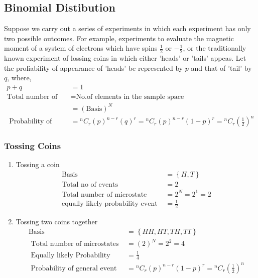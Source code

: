 \subsection{ Binomial Distibution}
Suppose we carry out a series of experiments in which each experiment has only two possible outcomes. For example, experiments to evaluate the magnetic moment of a system of electrons which have spins $\frac{1}{2}$ or $-\frac{1}{2}$, or the traditionally known experiment of lossing coins in which either 'heads' or 'tails' appeas. Let the proliabifity of appearance of 'heads' be represented by $p$ and that of 'tail' by $q$, where,
\begin{align*}
p+q&=1\\
\text{Total number of microstate }&=\text{No.of elements in the sample space}\\&=\left(\text{Basis} \right)^N\\
\text { Probability of general event } 
&={ }^{n} C_{r}(p)^{n-r}(q)^{r} ={ }^{n} C_{r}(p)^{n-r}(1-p)^{r}=
{ }^{n} C_{r}\left(\frac{1}{2}\right)^{n}
\end{align*}
\subsubsection{ Tossing Coins}
\begin{enumerate}
	\item Tossing a coin
	\begin{align*}
	\text{Basis }&=\left\lbrace H,T\right\rbrace \\
	\text{Total no of events }&=2\\
	\text{Total number of microstate }&=2^N=2^1=2 \\
	\text{equally likely probability event }&=\frac{1}{2} 
	\end{align*}
	\item {Tossing two coins together}
	\begin{align*}
	\text{Basis }&=\left\lbrace H H, H T, T H, T T\right\rbrace \\
	\text{ Total number of microstates }&=(2)^{N}=2^2=4\\
	\text{ Equally likely Probability }&=\frac{1}{4} \\
	\text { Probability of general event } 
	&={ }^{n} C_{r}(p)^{n-r}(1-p)^{r} =
	{ }^{n} C_{r}\left(\frac{1}{2}\right)^{n}
	\end{align*}
\end{enumerate}
